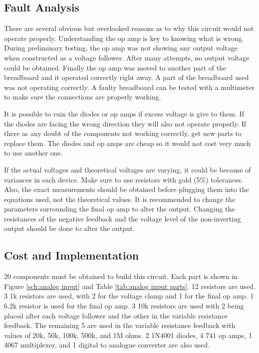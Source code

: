 \subsection{Fault Analysis}
There are several obvious but overlooked reasons as to why this circuit 
would not operate properly. Understanding the op amp is key to knowing what is
 wrong. During preliminary testing, the op amp was not showing any output
 voltage when constructed as a voltage follower. After many attempts, no output
 voltage could be obtained. Finally the op amp was moved to another part of
 the breadboard and it operated correctly right away. A part of the breadboard
 used was not operating correctly. A faulty breadboard can be tested with a 
multimeter to make sure the connections are properly working.

It is possible to ruin the diodes or op amps if excess voltage is give to
 them. If the diodes are facing the wrong direction they will also not operate
 properly. If there as any doubt of the components not working correctly, get
 new parts to replace them. The diodes and op amps are cheap so it would not 
cost very much to use another one.

If the actual voltages and theoretical voltages are varying, it could be 
because of variances in each device. Make sure to use resistors with gold (5\%)
 tolerances. Also, the exact measurements should be obtained before plugging
 them into the equations used, not the theoretical values.
	It is recommended to change the parameters surrounding the final op amp to 
alter the output. Changing the resistances of the negative feedback and the
 voltage level of the non-inverting output should be done to alter the output.

\subsection{Cost and Implementation}
20 components must be obtained to build this circuit. Each part is shown in 
Figure \ref{sch:analog input} and Table \ref{tab:analog input parts}. 12 resistors are used. 3 1k resistors are used, with 2 for the voltage clamp and 1 for the final op amp. 1 6.2k resistor is used for the final op amp. 3 10k resistors are used with 2 being placed after each voltage follower and the other in the variable resistance feedback. The remaining 5 are used in the variable resistance feedback with values of 20k, 50k, 100k, 500k, and 1M ohms.
	2 1N4001 diodes, 4 741 op amps, 1 4067 multiplexer, and 1 digital to
 analogue converter are also used.

